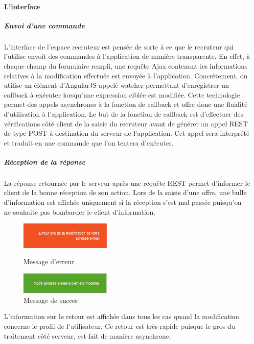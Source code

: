 \paragraph{L'interface}
\label{par:L'interface}
\subparagraph{Envoi d'une commande}
\label{subp:Envoi d'une commande}
L'interface de l'espace recruteur est pensée de sorte à ce que le recruteur qui l'utilise envoit des commandes à l'application de manière transparente.
En effet, à chaque champ du formulaire rempli, une requête Ajax contenant les informations relatives à la modification effectuée est envoyée à l'application.
Concrètement, on utilise un élément d'AngularJS appelé watcher permettant d'enregistrer un callback à exécuter lorsqu'une expression ciblée est modifiée.
Cette technologie permet des appels asynchrones à la fonction de callback et offre donc une fluidité d'utilisation à l'application.
Le but de la fonction de callback est d'effectuer des vérifications côté client de la saisie du recruteur avant de générer un appel REST de type POST à destination du serveur de l'application.
Cet appel sera interprété et traduit en une commande que l'on tentera d'exécuter.
\subparagraph{Réception de la réponse}
\label{subp:Réception de la réponse}
La réponse retournée par le serveur après une requête REST permet d'informer le client de la bonne réception de son action.
Lors de la saisie d'une offre, une bulle d'information est affichée uniquement si la réception s'est mal passée puisqu'on ne souhaite pas bombarder le client d'information.
\begin{figure}[h]
  \begin{center}
    \includegraphics[width=0.4\textwidth]{Pictures/implementation/capsule_orange.png}
    \caption{Message d'erreur}
    \vspace{1em}
    \includegraphics[width=0.4\textwidth]{Pictures/implementation/capsule_verte.png}
    \caption{Message de succes}
  \end{center}
\end{figure}
L'information sur le retour est affichée dans tous les cas quand la modification concerne le profil de l'utilisateur.
Ce retour est très rapide puisque le gros du traitement côté serveur, est fait de manière asynchrone.
